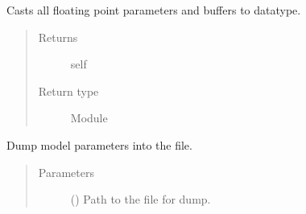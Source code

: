 \documentclass[letterpaper,10pt,english]{sphinxmanual}
\begin{document}
\begin{fulllineitems}
\begin{fulllineitems}
\begin{quote}
\begin{description}
\end{description}\end{quote}

\end{fulllineitems}


\begin{fulllineitems}
\label{\detokenize{api/autoencoding:geology.metamodelling.SpatialAutoencoder.double}}
Casts all floating point parameters and buffers to  datatype.
\begin{quote}\begin{description}
\item[{Returns}] \leavevmode
self

\item[{Return type}] \leavevmode
Module

\end{description}\end{quote}

\end{fulllineitems}


\begin{fulllineitems}
\label{\detokenize{api/autoencoding:geology.metamodelling.SpatialAutoencoder.dump}}
Dump model parameters into the file.
\begin{quote}\begin{description}
\item[{Parameters}] \leavevmode
{} () \textendash{} Path to the file for dump.

\end{description}\end{quote}

\end{fulllineitems}


\begin{fulllineitems}
\label{\detokenize{api/autoencoding:geology.metamodelling.SpatialAutoencoder.dump_patches}}
\end{fulllineitems}


\end{fulllineitems}
\end{document}
